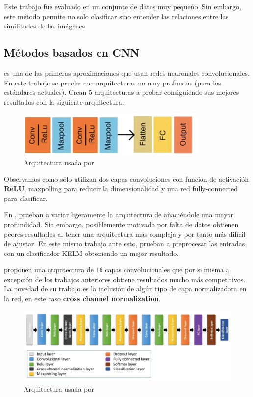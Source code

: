 Este trabajo fue evaluado en un conjunto de datos muy pequeño. Sin embargo, este método permite no solo clasificar sino entender las relaciones entre las similitudes de las imágenes.

\subsection{Métodos basados en CNN}

\cite{abiwinanda2019brain} es una de las primeras aproximaciones que usan redes neuronales convolucionales. En este trabajo se prueba con arquitecturas no muy profundas (para los estándares actuales). Crean $5$ arquitecturas a probar consiguiendo sus mejores resultados con la siguiente arquitectura.

\begin{figure}[H]
	\centering
	\includegraphics[width=0.5\linewidth]{imagenes/abiwinanda2019brain.png}
	\caption{Arquitectura usada por \cite{abiwinanda2019brain}}
\end{figure}

Observamos como sólo utilizan dos capas convoluciones con función de activación \textbf{ReLU}, maxpolling para reducir la dimensionalidad y una red fully-connected para clasificar.

En \cite{pashaei2018brain}, prueban a variar ligeramente la arquitectura de \cite{abiwinanda2019brain} añadiéndole una mayor profundidad. Sin embargo, posiblemente motivado por falta de datos obtienen peores resultados al tener una arquitectura más compleja y por tanto más difícil de ajustar. En este mismo trabajo ante esto, prueban a preprocesar las entradas con un clasificador KELM obteniendo un mejor resultado.

\cite{sultan2019multi} proponen una arquitectura de $16$ capas convolucionales que por si misma a excepción de los trabajos anteriores obtiene resultados mucho más competitivos. La novedad de su trabajo es la inclusión de algún tipo de capa normalizadora en la red, en este caso \textbf{cross channel normalization}. 

\begin{figure}[H]
	\centering
	\includegraphics[width=1.0\linewidth]{imagenes/sultan2019multi.png}
	\caption{Arquitectura usada por \cite{sultan2019multi}}
\end{figure}


